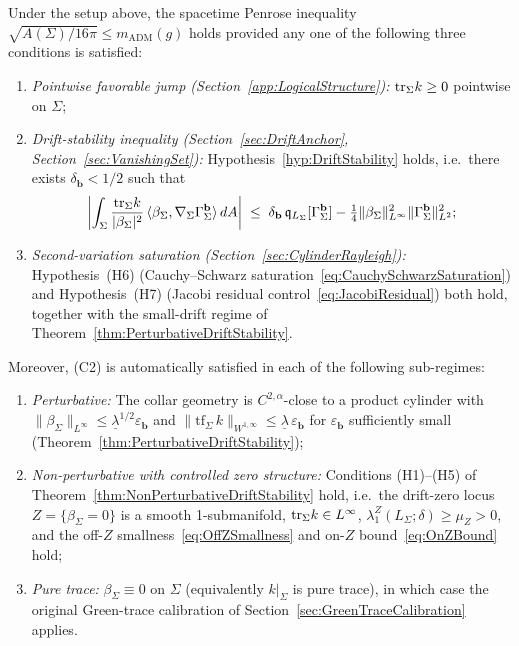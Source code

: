 \begin{theorem}\label{thm:ConsolidatedStatus}
Under the setup above, the spacetime Penrose inequality $\sqrt{A(\Sigma)/16\pi}\le m_{\mathrm{ADM}}(g)$ holds provided any one of the following three conditions is satisfied:
\begin{enumerate}
    \item[\textup{(C1)}] \emph{Pointwise favorable jump (Section~\ref{app:LogicalStructure}):} $\mathrm{tr}_\Sigma k\ge0$ pointwise on $\Sigma$;
    \item[\textup{(C2)}] \emph{Drift-stability inequality (Section~\ref{sec:DriftAnchor}, Section~\ref{sec:VanishingSet}):} Hypothesis~\ref{hyp:DriftStability} holds, i.e.\ there exists $\delta_{\mathbf b}<1/2$ such that
    \[
        \biggl|\int_\Sigma\frac{\mathrm{tr}_\Sigma k}{|\beta_\Sigma|^2}\,\langle\beta_\Sigma,\nabla_\Sigma\Gamma_\Sigma^{\mathbf b}\rangle\,dA\biggr|
        \;\le\;\delta_{\mathbf b}\,\mathfrak q_{L_\Sigma}[\Gamma_\Sigma^{\mathbf b}]
        -\tfrac14\|\beta_\Sigma\|_{L^\infty}^2\|\Gamma_\Sigma^{\mathbf b}\|_{L^2}^2 ;
    \]
    \item[\textup{(C3)}] \emph{Second-variation saturation (Section~\ref{sec:CylinderRayleigh}):} Hypothesis~\textup{(H6)} (Cauchy--Schwarz saturation~\eqref{eq:CauchySchwarzSaturation}) and Hypothesis~\textup{(H7)} (Jacobi residual control~\eqref{eq:JacobiResidual}) both hold, together with the small-drift regime of Theorem~\ref{thm:PerturbativeDriftStability}.
\end{enumerate}
Moreover, (C2) is automatically satisfied in each of the following sub-regimes:
\begin{enumerate}
    \item[\textup{(C2a)}] \emph{Perturbative:} The collar geometry is $C^{2,\alpha}$-close to a product cylinder with $\|\beta_\Sigma\|_{L^\infty}\le\underline\lambda^{1/2}\varepsilon_{\mathbf b}$ and $\|\mathrm{tf}_\Sigma\,k\|_{W^{1,\infty}}\le\underline\lambda\,\varepsilon_{\mathbf b}$ for $\varepsilon_{\mathbf b}$ sufficiently small (Theorem~\ref{thm:PerturbativeDriftStability});
    \item[\textup{(C2b)}] \emph{Non-perturbative with controlled zero structure:} Conditions (H1)--(H5) of Theorem~\ref{thm:NonPerturbativeDriftStability} hold, i.e.\ the drift-zero locus $Z=\{\beta_\Sigma=0\}$ is a smooth 1-submanifold, $\mathrm{tr}_\Sigma k\in L^\infty$, $\lambda_1^Z(L_\Sigma;\delta)\ge\mu_Z>0$, and the off-$Z$ smallness~\eqref{eq:OffZSmallness} and on-$Z$ bound~\eqref{eq:OnZBound} hold;
    \item[\textup{(C2c)}] \emph{Pure trace:} $\beta_\Sigma\equiv0$ on $\Sigma$ (equivalently $k|_\Sigma$ is pure trace), in which case the original Green-trace calibration of Section~\ref{sec:GreenTraceCalibration} applies.
\end{enumerate}
\end{theorem}

